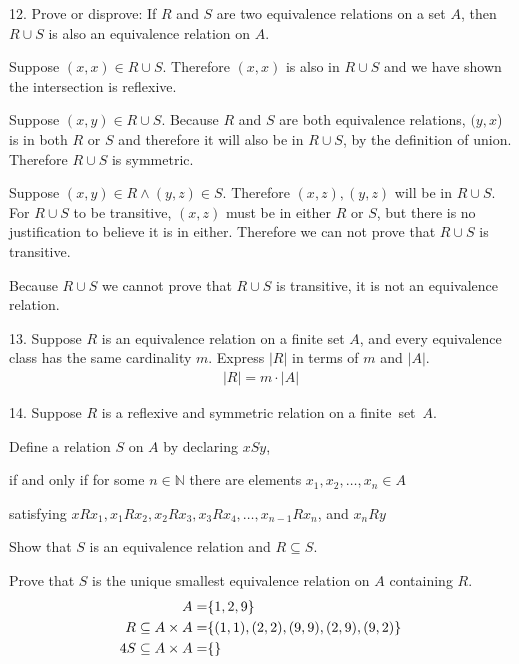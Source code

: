 \documentclass{article}
\begin{document}
\begin{exercise}{}{}{12. Prove or disprove: If $R$ and $S$ are two equivalence
		relations on a set $A$, then $R \cup S$ is also an equivalence relation on $A$.}
	\begin{alist}
		\item Suppose $(x, x) \in R\cup S$. Therefore $(x, x)$ is also in $R
			\cup S$ and we have shown the intersection is reflexive.
		\item Suppose $(x, y) \in R\cup S$.  Because $R$ and $S$ are both
		equivalence relations, $(y, x$) is in both $R$ or $S$ and therefore
		it will also be in $R\cup S$, by the definition of union. Therefore
		$R\cup S$ is symmetric.
		\item Suppose $(x, y)\in R \land (y, z) \in S$. Therefore $(x, z), (y,
			z)$ will be in $R\cup S$. For $R\cup S$ to be transitive, $(x, z)$
		must be in either $R$ or $S$, but there is no justification to
		believe it is in either. Therefore we can not prove that $R\cup S$
		is transitive.
		\item Because $R\cup S$  we cannot prove that $R\cup S$ is transitive,
		it is not an equivalence relation.
	\end{alist}
\end{exercise}

\begin{exercise}{}{}
	{13. Suppose $R$ is an equivalence relation on a finite set
		$A$, and every equivalence class has the same cardinality $m$. Express $|R|$
		in terms of $m$ and $|A|$.}
	\begin{align*}
		|R| = m \cdot |A|
	\end{align*}
\end{exercise}{}{}

\begin{exercise}{}{}
	{14. Suppose $R$ is a reflexive and symmetric relation on a
		\mbox{finite set $A$.}}
	\begin{alist}
		\item Define a relation $S$ on $A$ by declaring $x S y$,
		\item if and only if for some $n \in \mathbb{N}$ there are elements $x_1, x_2, \ldots, x_n \in A$
		\item satisfying $x R x_1, x_1 R x_2, x_2 R x_3, x_3 R x_4, \ldots, x_{n-1} R x_n$, and $x_n R y$
		\item Show that $S$ is an equivalence relation and $R \subseteq S$.
		\item Prove that $S$ is the unique smallest equivalence relation on $A$ containing $R$.
		\begin{align*}
			A=                     & \{1, 2, 9\}                                \\
			R\subseteq A\times A=  & \{(1, 1), (2, 2), (9, 9), (2, 9), (9, 2)\} \\
			4S\subseteq A\times A= & \{\}
		\end{align*}
	\end{alist}
\end{exercise}{}{}
\end{document}
